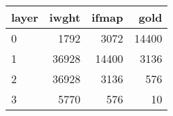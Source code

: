 \begin{tabular}{lrrr}
\toprule
layer &  iwght &  ifmap &  gold \\
\midrule
    0 &   1792 &   3072 & 14400 \\
    1 &  36928 &  14400 &  3136 \\
    2 &  36928 &   3136 &   576 \\
    3 &   5770 &    576 &    10 \\
\bottomrule
\end{tabular}
